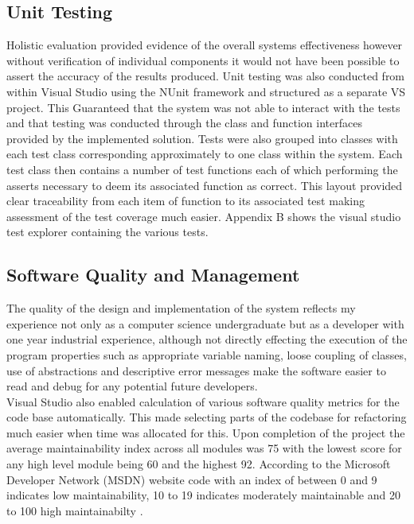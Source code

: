 \subsection{Unit Testing}
Holistic evaluation provided evidence of the overall systems effectiveness however without verification of individual components it would not have been possible to assert the accuracy of the results produced. Unit testing was also conducted from within Visual Studio using the NUnit framework and structured as a separate VS project. This Guaranteed that the system was not able to interact with the tests and that testing was conducted through the class and function interfaces provided by the implemented solution. Tests were also grouped into classes with each test class corresponding approximately to one class within the system. Each test class then contains a number of test functions each of which performing the asserts necessary to deem its associated function as correct. This layout provided clear traceability from each item of function to its associated test making assessment of the test coverage much easier. Appendix B shows the visual studio test explorer containing the various tests. \\


\subsection{Software Quality and Management}
The quality of the design and implementation of the system reflects my experience not only as a computer science undergraduate but as a developer with one year industrial experience, although not directly effecting the execution of the program properties such as appropriate variable naming, loose coupling of classes, use of abstractions and descriptive error messages make the software easier to read and debug for any potential future developers. \\

\noindent
Visual Studio also enabled calculation of various software quality metrics for the code base automatically. This made selecting parts of the codebase for refactoring much easier when time was allocated for this. Upon completion of the project the average maintainability index across all modules was 75 with the lowest score for any high level module being 60 and the highest 92. According to the Microsoft Developer Network (MSDN) website code with an index of between 0 and 9 indicates low maintainability, 10 to 19 indicates moderately maintainable and 20 to 100 high maintainabilty \cite{VisualStudioMaintainIndex}. \\

